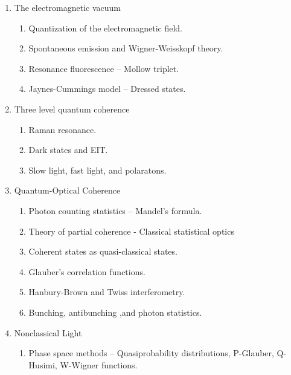 \documentclass[letterpaper,10pt,english]{sphinxmanual}
\begin{document}
\begin{enumerate}
\begin{enumerate}
\end{enumerate}

\item {} 
The electromagnetic vacuum
\begin{enumerate}
\item {} 
Quantization of the electromagnetic field.

\item {} 
Spontaneous emission and Wigner-Weisskopf theory.

\item {} 
Resonance fluorescence -- Mollow triplet.

\item {} 
Jaynes-Cummings model -- Dressed states.

\end{enumerate}

\item {} 
Three level quantum coherence
\begin{enumerate}
\item {} 
Raman resonance.

\item {} 
Dark states and EIT.

\item {} 
Slow light, fast light, and polaratons.

\end{enumerate}

\item {} 
Quantum-Optical Coherence
\begin{enumerate}
\item {} 
Photon counting statistics -- Mandel's formula.

\item {} 
Theory of partial coherence - Classical statistical optics

\item {} 
Coherent states as quasi-classical states.

\item {} 
Glauber's correlation functions.

\item {} 
Hanbury-Brown and Twiss interferometry.

\item {} 
Bunching, antibunching ,and photon statistics.

\end{enumerate}

\item {} 
Nonclassical Light
\begin{enumerate}
\item {} 
Phase space methods -- Quasiprobability distributions, P-Glauber, Q-Husimi, W-Wigner functions.


\end{enumerate}
\end{enumerate}
\end{document}
